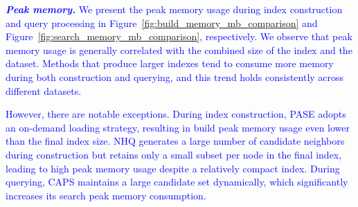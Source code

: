 \documentclass[sigconf, nonacm]{acmart}
\begin{document}
{%


%
%
\textcolor{blue}{\textit{\textbf{Peak memory.}}	
We present the peak memory usage during index construction and query processing in Figure~\ref{fig:build_memory_mb_comparison} and Figure~\ref{fig:search_memory_mb_comparison}, respectively. We observe that peak memory usage is generally correlated with the combined size of the index and the dataset. Methods that produce larger indexes tend to consume more memory during both construction and querying, and this trend holds consistently across different datasets.}

\textcolor{blue}{However, there are notable exceptions. During index construction, PASE adopts an on-demand loading strategy, resulting in build peak memory usage even lower than the final index size. NHQ generates a large number of candidate neighbors during construction but retains only a small subset per node in the final index, leading to high peak memory usage despite a relatively compact index.
During querying, CAPS maintains a large candidate set dynamically, which significantly increases its search peak memory consumption.}

}
\end{document}
